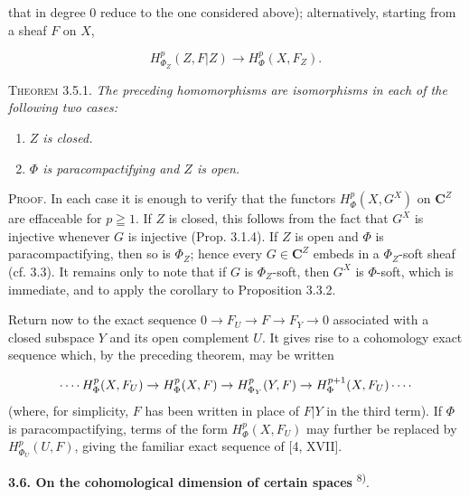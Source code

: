
\noindent that in degree 0 reduce to the one considered above); alternatively,
starting from a sheaf $F$ on $X$,

\[
H^p_{\Phi_Z}(Z,F\vert Z)\to H^p_\Phi(X,F_Z).
\]

\indent\textsc{Theorem 3.5.1.} \textit{The preceding homomorphisms are
isomorphisms in each of the following two cases:}
\begin{enumerate}
\item \textit{$Z$ is closed.}
\item \textit{$\Phi$ is paracompactifying and $Z$ is open.}
\end{enumerate}

\indent\textsc{Proof.} In each case it is enough to verify that the functors
$H^p_\Phi(X,G^X)$ on $\mathbf C^Z$ are effaceable for $p\geqq1$. If $Z$ is closed,
this follows from the fact that $G^X$ is injective whenever $G$ is injective
(Prop. 3.1.4). If $Z$ is open and $\Phi$ is paracompactifying, then so is
$\Phi_Z$; hence every $G\in \mathbf C^Z$ embeds in a $\Phi_Z$-soft sheaf (cf. 3.3).
It remains only to note that if $G$ is $\Phi_Z$-soft, then $G^X$ is
$\Phi$-soft, which is immediate, and to apply the corollary to Proposition
3.3.2.

Return now to the exact sequence
$0\to F_U\to F\to F_Y\to0$
associated with a closed subspace $Y$ and its open complement $U$. It gives
rise to a cohomology exact sequence which, by the preceding theorem, may be
written

\[
\mathinner{\cdotp\cdotp\cdotp\cdotp} H^p_\Phi(X,F_U)\to H^p_\Phi(X,F)
\to H^p_{\Phi_Y}(Y,F)\to
H^{p+1}_\Phi(X,F_U)\mathinner{\cdotp\cdotp\cdotp\cdotp}
\]
(where, for simplicity, $F$ has been written in place of $F\vert Y$ in the
third term).
If $\Phi$ is paracompactifying, terms of the form $H^p_\Phi(X,F_U)$ may
further be replaced by $H^p_{\Phi_U}(U,F)$, giving the familiar exact
sequence of [4, XVII].

\indent\textbf{3.6. On the cohomological dimension of certain spaces}%
\textsuperscript{8)}.

